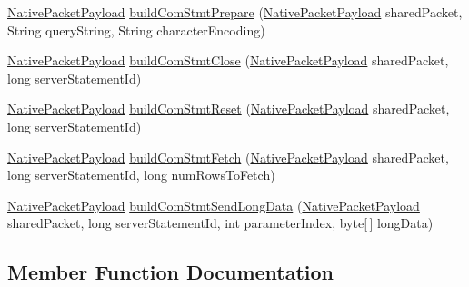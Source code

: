 \begin{DoxyCompactItemize}
\item 
\mbox{\hyperlink{classcom_1_1mysql_1_1cj_1_1protocol_1_1a_1_1_native_packet_payload}{Native\+Packet\+Payload}} \mbox{\hyperlink{classcom_1_1mysql_1_1cj_1_1protocol_1_1a_1_1_native_message_builder_a37e0e828792aea6a797e9c2a4dc3b955}{build\+Com\+Stmt\+Prepare}} (\mbox{\hyperlink{classcom_1_1mysql_1_1cj_1_1protocol_1_1a_1_1_native_packet_payload}{Native\+Packet\+Payload}} shared\+Packet, String query\+String, String character\+Encoding)
\item 
\mbox{\hyperlink{classcom_1_1mysql_1_1cj_1_1protocol_1_1a_1_1_native_packet_payload}{Native\+Packet\+Payload}} \mbox{\hyperlink{classcom_1_1mysql_1_1cj_1_1protocol_1_1a_1_1_native_message_builder_ab39f5f9e164ef6e46a0e0908a3f78608}{build\+Com\+Stmt\+Close}} (\mbox{\hyperlink{classcom_1_1mysql_1_1cj_1_1protocol_1_1a_1_1_native_packet_payload}{Native\+Packet\+Payload}} shared\+Packet, long server\+Statement\+Id)
\item 
\mbox{\hyperlink{classcom_1_1mysql_1_1cj_1_1protocol_1_1a_1_1_native_packet_payload}{Native\+Packet\+Payload}} \mbox{\hyperlink{classcom_1_1mysql_1_1cj_1_1protocol_1_1a_1_1_native_message_builder_a4acc76dd73bf697fc9757adf5e379682}{build\+Com\+Stmt\+Reset}} (\mbox{\hyperlink{classcom_1_1mysql_1_1cj_1_1protocol_1_1a_1_1_native_packet_payload}{Native\+Packet\+Payload}} shared\+Packet, long server\+Statement\+Id)
\item 
\mbox{\hyperlink{classcom_1_1mysql_1_1cj_1_1protocol_1_1a_1_1_native_packet_payload}{Native\+Packet\+Payload}} \mbox{\hyperlink{classcom_1_1mysql_1_1cj_1_1protocol_1_1a_1_1_native_message_builder_a90d0a8827a6f07a6c70ffc5e3606b017}{build\+Com\+Stmt\+Fetch}} (\mbox{\hyperlink{classcom_1_1mysql_1_1cj_1_1protocol_1_1a_1_1_native_packet_payload}{Native\+Packet\+Payload}} shared\+Packet, long server\+Statement\+Id, long num\+Rows\+To\+Fetch)
\item 
\mbox{\hyperlink{classcom_1_1mysql_1_1cj_1_1protocol_1_1a_1_1_native_packet_payload}{Native\+Packet\+Payload}} \mbox{\hyperlink{classcom_1_1mysql_1_1cj_1_1protocol_1_1a_1_1_native_message_builder_a1b4d0f770f5d97e69682bdcaa9e1bd6e}{build\+Com\+Stmt\+Send\+Long\+Data}} (\mbox{\hyperlink{classcom_1_1mysql_1_1cj_1_1protocol_1_1a_1_1_native_packet_payload}{Native\+Packet\+Payload}} shared\+Packet, long server\+Statement\+Id, int parameter\+Index, byte\mbox{[}$\,$\mbox{]} long\+Data)
\end{DoxyCompactItemize}


\subsection{Member Function Documentation}
\mbox{\label{classcom_1_1mysql_1_1cj_1_1protocol_1_1a_1_1_native_message_builder_abf38281f5fca836c56d94270cad2fcde}} 
